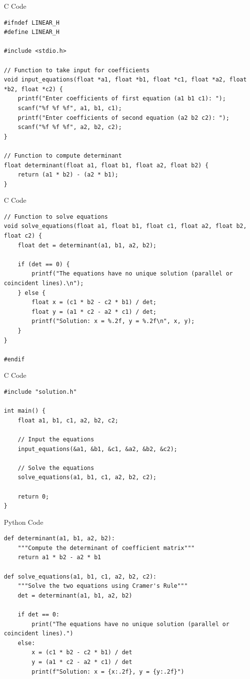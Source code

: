\documentclass{beamer}
\begin{document}
\begin{frame}[fragile]{C Code}
    \begin{verbatim}
#ifndef LINEAR_H
#define LINEAR_H

#include <stdio.h>

// Function to take input for coefficients
void input_equations(float *a1, float *b1, float *c1, float *a2, float *b2, float *c2) {
    printf("Enter coefficients of first equation (a1 b1 c1): ");
    scanf("%f %f %f", a1, b1, c1);
    printf("Enter coefficients of second equation (a2 b2 c2): ");
    scanf("%f %f %f", a2, b2, c2);
}

// Function to compute determinant
float determinant(float a1, float b1, float a2, float b2) {
    return (a1 * b2) - (a2 * b1);
}
    \end{verbatim}
\end{frame}

\begin{frame}[fragile]{C Code}
    \begin{verbatim}
// Function to solve equations
void solve_equations(float a1, float b1, float c1, float a2, float b2, float c2) {
    float det = determinant(a1, b1, a2, b2);

    if (det == 0) {
        printf("The equations have no unique solution (parallel or coincident lines).\n");
    } else {
        float x = (c1 * b2 - c2 * b1) / det;
        float y = (a1 * c2 - a2 * c1) / det;
        printf("Solution: x = %.2f, y = %.2f\n", x, y);
    }
}

#endif
    \end{verbatim}
\end{frame}

\begin{frame}[fragile]{C Code}
    \begin{verbatim}
#include "solution.h"

int main() {
    float a1, b1, c1, a2, b2, c2;

    // Input the equations
    input_equations(&a1, &b1, &c1, &a2, &b2, &c2);

    // Solve the equations
    solve_equations(a1, b1, c1, a2, b2, c2);

    return 0;
}
    \end{verbatim}
\end{frame}

\begin{frame}[fragile]{Python Code}
    \begin{verbatim}
def determinant(a1, b1, a2, b2):
    """Compute the determinant of coefficient matrix"""
    return a1 * b2 - a2 * b1

def solve_equations(a1, b1, c1, a2, b2, c2):
    """Solve the two equations using Cramer's Rule"""
    det = determinant(a1, b1, a2, b2)

    if det == 0:
        print("The equations have no unique solution (parallel or coincident lines).")
    else:
        x = (c1 * b2 - c2 * b1) / det
        y = (a1 * c2 - a2 * c1) / det
        print(f"Solution: x = {x:.2f}, y = {y:.2f}")
    \end{verbatim}
\end{frame}
\end{document}
